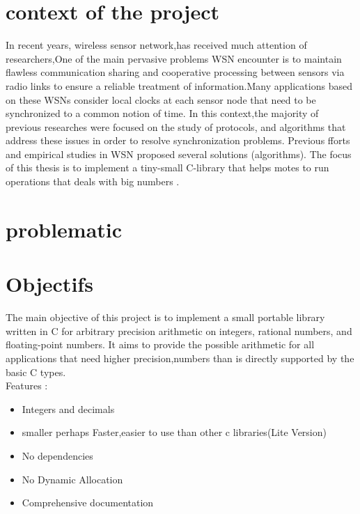 \section{context of the project}
In recent years,  wireless  sensor network,has received much attention  of  researchers,One of the main pervasive problems WSN
encounter is  to maintain  flawless communication sharing  and  cooperative 
processing between sensors  via  radio  links to  ensure a  reliable  treatment  of 
information.Many  applications  based  on  these  WSNs consider local  clocks  at  each  sensor node  that  need  to  be  synchronized  to  a  common  notion  of  time.
In  this  context,the  majority  of  previous  researches were focused  on  the  study  of  protocols,  and algorithms   that   address   these issues   in   order   to   resolve  synchronization problems. Previous  fforts and empirical  studies  in WSN proposed several solutions (algorithms). 
The focus of this thesis is to implement a tiny-small C-library that helps motes to run operations that deals with big numbers .  
\section{problematic}	

\section{Objectifs}
The main objective of this project is to implement a small portable library written in C for arbitrary precision arithmetic on integers, rational numbers, and floating-point numbers.  It aims to provide the possible arithmetic for all applications that need higher precision,numbers than is directly supported by the basic C types.\\
Features : 
 \begin{itemize}
	\item Integers and decimals
	\item smaller perhaps Faster,easier to use than other c libraries(Lite Version)
	\item No dependencies
	\item No Dynamic Allocation
	\item Comprehensive documentation 

\end{itemize}
